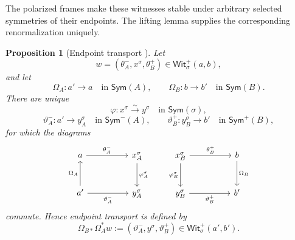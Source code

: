 \documentclass[oneside]{article}
\newcommand{\Sym}{\mathsf{Sym}}
\newcommand{\Wit}{\mathsf{Wit}}
\theoremstyle{plain}
\newtheorem{proposition}[theorem]{Proposition}
\theoremstyle{definition}
\theoremstyle{remark}
\begin{document}
The polarized frames make these witnesses stable under arbitrary selected symmetries of their endpoints. The lifting lemma supplies the corresponding renormalization uniquely.

\begin{proposition}[Endpoint transport {\cite[Proposition~5.6]{ClairambaultOlimpieriPaquet2025}}]
\label{prop:cgqg-background-positive-witness-transport}
    Let
    \[
        w=(\theta_A^-,x^\sigma,\theta_B^+)
        \in\Wit_\sigma^+(a,b),
    \]
    and let
    \[
        \Omega_A:a'\longrightarrow a
        \quad\text{in }\Sym(A),
        \qquad
        \Omega_B:b\longrightarrow b'
        \quad\text{in }\Sym(B).
    \]
    There are unique
    \[
        \varphi:x^\sigma\xrightarrow{\sim}y^\sigma
        \quad\text{in }\Sym(\sigma),
    \]
    \[
        \vartheta_A^-:
        a'\longrightarrow y_A^\sigma
        \quad\text{in }\Sym^-(A),
        \qquad
        \vartheta_B^+:
        y_B^\sigma\longrightarrow b'
        \quad\text{in }\Sym^+(B),
    \]
    for which the diagrams
    \begin{equation*}
        \begin{tikzcd}[column sep=huge, row sep=large]
            a
              \arrow[r,"\theta_A^-"]
            &
            x_A^\sigma
              \arrow[d,"\varphi_A^\sigma"]
            \\
            a'
              \arrow[u,"\Omega_A"]
              \arrow[r,"\vartheta_A^- "']
            &
            y_A^\sigma
        \end{tikzcd}
        \qquad
        \begin{tikzcd}[column sep=huge, row sep=large]
            x_B^\sigma
              \arrow[r,"\theta_B^+"]
              \arrow[d,"\varphi_B^\sigma"']
            &
            b
              \arrow[d,"\Omega_B"]
            \\
            y_B^\sigma
              \arrow[r,"\vartheta_B^+"']
            &
            b'
        \end{tikzcd}
    \end{equation*}
    commute. Hence endpoint transport is defined by
    \begin{equation}
        \Omega_{B*}\Omega_A^*w
        :=
        (\vartheta_A^-,y^\sigma,\vartheta_B^+)
        \in\Wit_\sigma^+(a',b').
    \label{eq:cgqg-background-positive-witness-transport}
    \end{equation}
\end{proposition}
\end{document}
